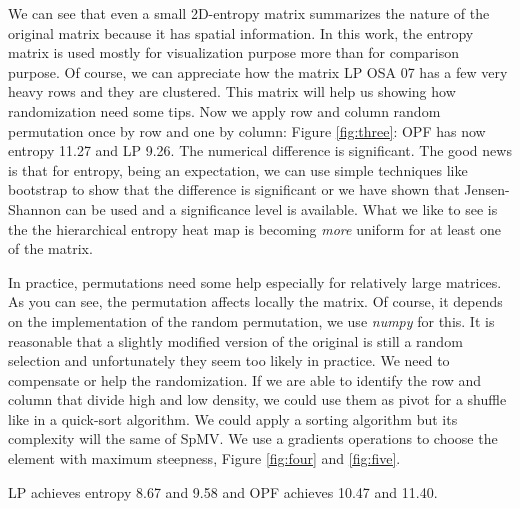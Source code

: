 \documentclass[acmsmall]{acmart}
\begin{document}

We can see that even a small 2D-entropy matrix summarizes the nature
of the original matrix because it has spatial information. In this
work, the entropy matrix is used mostly for visualization purpose more
than for comparison purpose. Of course, we can appreciate how the
matrix LP OSA 07 has a few very heavy rows and they are
clustered. This matrix will help us showing how randomization need
some tips. Now we apply row and column random permutation once by row
and one by column: Figure \ref{fig:three}: OPF has now entropy 11.27
and LP 9.26. The numerical difference is significant. The good news is
that for entropy, being an expectation, we can use simple techniques
like bootstrap to show that the difference is significant or we have
shown that Jensen-Shannon can be used and a significance level is
available. What we like to see is the the hierarchical entropy heat
map is becoming {\em more} uniform for at least one of the matrix.


In practice, permutations need some help especially for relatively
large matrices. As you can see, the permutation affects locally the
matrix. Of course, it depends on the implementation of the random
permutation, we use {\em numpy} for this. It is reasonable that a
slightly modified version of the original is still a random selection
and unfortunately they seem too likely in practice. We need to
compensate or help the randomization. If we are able to identify the
row and column that divide high and low density, we could use them as
pivot for a shuffle like in a quick-sort algorithm. We could apply a
sorting algorithm but its complexity will the same of SpMV. We use a
gradients operations to choose the element with maximum steepness,
Figure \ref{fig:four} and \ref{fig:five}.

LP achieves entropy 8.67 and 9.58 and OPF achieves 10.47 and 11.40.

\end{document}
